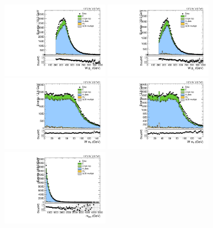 \begin{figure}[htbp]
  \centering
  \includegraphics[width=0.4\textwidth]{fig/analysis/SB_b1_mu_allP_allC_allE_Run2_lnujj_l1_pt.pdf}
  \includegraphics[width=0.4\textwidth]{fig/analysis/SB_b1_e_allP_allC_allE_Run2_lnujj_l1_pt.pdf}\\
  \includegraphics[width=0.4\textwidth]{fig/analysis/SB_b1_mu_allP_allC_allE_Run2_lnujj_l1_mt.pdf}
  \includegraphics[width=0.4\textwidth]{fig/analysis/SB_b1_e_allP_allC_allE_Run2_lnujj_l1_mt.pdf}\\
  \includegraphics[width=0.4\textwidth]{fig/analysis/SB_b1_mu_allP_allC_allE_Run2_mWV.pdf}

\end{figure}
